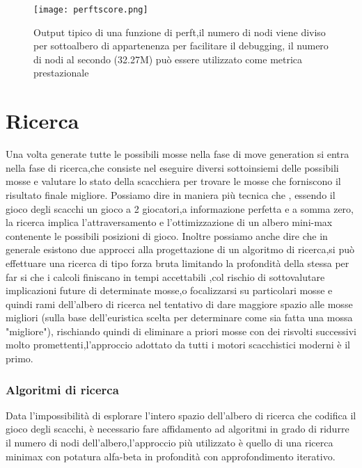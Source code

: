 \begin{figure}[H]
    \centering
    \texttt{[image: perftscore.png]}
    \caption{Output tipico di una funzione di perft,il numero di nodi viene diviso per sottoalbero di appartenenza per facilitare il debugging, il numero di nodi al secondo (32.27M) può essere utilizzato come metrica prestazionale}
\end{figure}


\section{Ricerca} \label{ricerca}
Una volta generate tutte le possibili mosse nella fase di move generation si entra nella fase di ricerca,che consiste nel eseguire diversi sottoinsiemi delle possibili mosse e valutare
lo stato della scacchiera per trovare le mosse che forniscono il risultato finale migliore. Possiamo dire in maniera più tecnica che , essendo il gioco degli scacchi un gioco
a 2 giocatori,a informazione perfetta e a somma zero, la ricerca implica l'attraversamento e l'ottimizzazione di un albero mini-max contenente le possibili posizioni di gioco.
Inoltre possiamo anche dire che in generale esistono due approcci alla progettazione di un algoritmo di ricerca,si può effettuare una ricerca di tipo forza bruta limitando la profondità
della stessa per far si che i calcoli finiscano in tempi accettabili ,col rischio di sottovalutare implicazioni future di determinate mosse,o focalizzarsi su particolari mosse e quindi
rami dell'albero di ricerca nel tentativo di dare maggiore spazio alle mosse migliori (sulla base dell'euristica scelta per determinare come sia fatta una mossa "migliore"), rischiando
quindi di eliminare a priori mosse con dei risvolti successivi molto promettenti,l'approccio adottato da tutti i motori scacchistici moderni è il primo.

\subsubsection{Algoritmi di ricerca}
Data l'impossibilità di esplorare l'intero spazio dell'albero di ricerca che codifica il gioco degli scacchi, è necessario fare affidamento ad algoritmi in
grado di ridurre il numero di nodi dell'albero,l'approccio più utilizzato è quello di una ricerca minimax con potatura alfa-beta in profondità con approfondimento iterativo.



